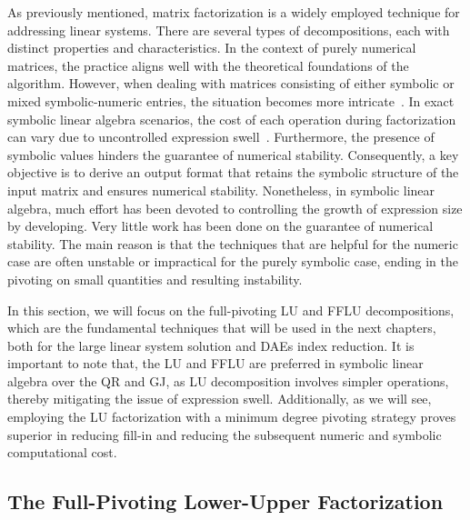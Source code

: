 As previously mentioned, matrix factorization is a widely employed technique for addressing linear systems. There are several types of decompositions, each with distinct properties and characteristics. In the context of purely numerical matrices, the practice aligns well with the theoretical foundations of the algorithm. However, when dealing with matrices consisting of either symbolic or mixed symbolic-numeric entries, the situation becomes more intricate~\cite{zhou2007symbolic}. In exact symbolic linear algebra scenarios, the cost of each operation during factorization can vary due to uncontrolled expression swell~\cite{zhou2006hierarchical}. Furthermore, the presence of symbolic values hinders the guarantee of numerical stability. Consequently, a key objective is to derive an output format that retains the symbolic structure of the input matrix and ensures numerical stability. Nonetheless, in symbolic linear algebra, much effort has been devoted to controlling the growth of expression size by developing. Very little work has been done on the guarantee of numerical stability. The main reason is that the techniques that are helpful for the numeric case are often unstable or impractical for the purely symbolic case, ending in the pivoting on small quantities and resulting instability.

In this section, we will focus on the full-pivoting \ac{LU} and \ac{FFLU} decompositions, which are the fundamental techniques that will be used in the next chapters, both for the large linear system solution and \acp{DAE} index reduction. It is important to note that, the \ac{LU} and \ac{FFLU} are preferred in symbolic linear algebra over the QR and \ac{GJ}, as \ac{LU} decomposition involves simpler operations, thereby mitigating the issue of expression swell. Additionally, as we will see, employing the \ac{LU} factorization with a minimum degree pivoting strategy proves superior in reducing fill-in and reducing the subsequent numeric and symbolic computational cost.

\subsection{The Full-Pivoting Lower-Upper Factorization}

